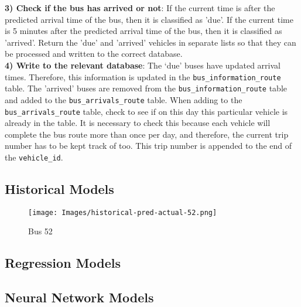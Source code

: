 \textbf{3) Check if the bus has arrived or not}:  If the current time is after the predicted arrival time of the bus, then it is classified as 'due'. If the current time is 5 minutes after the predicted arrival time of the bus, then it is classified as 'arrived'. Return the 'due' and 'arrived' vehicles in separate lists so that they can be processed and written to the correct database. \\

\textbf{4) Write to the relevant database}: The `due' buses have updated arrival times. Therefore, this information is updated in the \texttt{bus\_information\_route} table. The 'arrived' buses are removed from the \texttt{bus\_information\_route} table and added to the \texttt{bus\_arrivals\_route} table. When adding to the \texttt{bus\_arrivals\_route} table, check to see if on this day this particular vehicle is already in the table. It is necessary to check this because each vehicle will complete the bus route more than once per day, and therefore, the current trip number has to be kept track of too. This trip number is appended to the end of the \texttt{vehicle\_id}.

\subsection{Historical Models}

\begin{figure}[H]
\begin{center}
    \texttt{[image: Images/historical-pred-actual-52.png]}
    \caption{Bus 52}
    \label{fig:historical-pred-actual}
\end{center}
\end{figure}

\subsection{Regression Models}

\subsection{Neural Network Models}

\clearpage